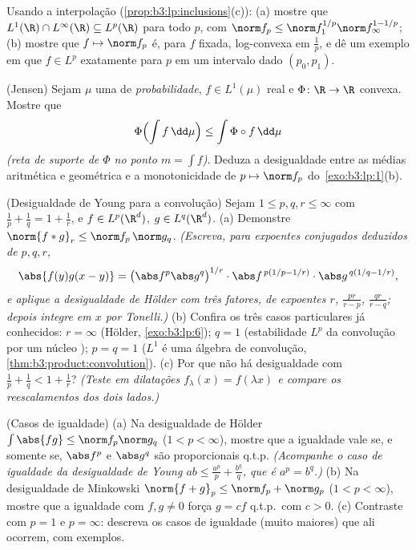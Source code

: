 \begin{exercise}[$\star\star$]\label{exo:b3:lp:9}
Usando a interpolação (\cref{prop:b3:lp:inclusions}(c)):
(a) mostre que $L^1(\R)\cap L^\infty(\R) \subseteq L^p(\R)$ para todo $p$, com $\norm f_p \leq \norm f_1^{1/p}\norm
f_\infty^{1 - 1/p}$;
(b) mostre que $f \mapsto \norm f_p$ é, para $f$ fixada, log-convexa em $\frac1p$, e dê
um exemplo em que $f \in L^p$ exatamente para $p$ em um intervalo dado
$(p_0, p_1)$.
\end{exercise}

\begin{exercise}[$\star\star$]\label{exo:b3:lp:10}
(Jensen) Sejam $\mu$ uma  de \emph{probabilidade}, $f \in
L^1(\mu)$ real
e $\Phi \colon \R \to \R$ convexa. Mostre que
\[
\Phi\Bigl(\int f\,\dd\mu\Bigr) \leq \int \Phi\circ
f\,\dd\mu
\]
\emph{(reta de suporte de $\Phi$ no ponto $m = \int f$)}. Deduza a
desigualdade entre as médias aritmética e geométrica e a monotonicidade
de $p \mapsto \norm f_p$ do~\cref{exo:b3:lp:1}(b).
\end{exercise}

\begin{exercise}[$\star\star\star$]\label{exo:b3:lp:11}
(Desigualdade de Young para a convolução) Sejam $1 \leq p, q, r \leq
\infty$ com $\frac1p + \frac1q = 1 + \frac1r$, e
$f \in
L^p(\R^d)$, $g \in L^q(\R^d)$.
(a) Demonstre $\norm{f * g}_r \leq \norm f_p\,\norm g_q$. \emph{(Escreva, para expoentes conjugados
deduzidos de $p, q,
r$,
\[
\abs{f(y)g(x-y)} = \bigl(\abs f^p\abs g^q\bigr)^{1/r}
\cdot\abs f^{\,p(1/p - 1/r)}\cdot\abs g^{\,q(1/q - 1/r)},
\]
e aplique a desigualdade de Hölder com três fatores, de expoentes
$r$, $\frac{pr}{r - p}$, $\frac{qr}{r - q}$; depois integre em $x$ por Tonelli.)}
(b) Confira os três casos particulares já conhecidos: $r =
\infty$ (Hölder,
\cref{exo:b3:lp:6}); $q = 1$ (estabilidade $L^p$ da convolução por um
núcleo ); $p = q = 1$ ($L^1$ é uma álgebra de convolução,
\cref{thm:b3:product:convolution}).
(c) Por que não há desigualdade com $\frac1p + \frac1q < 1 +
\frac1r$? \emph{(Teste em dilatações
$f_\lambda(x) =
f(\lambda x)$ e compare os reescalamentos dos dois lados.)}
\end{exercise}

\begin{exercise}[$\star\star$]\label{exo:b3:lp:12}
(Casos de igualdade) (a) Na desigualdade de Hölder $\int\abs{fg} \leq \norm f_p\norm g_q$ ($1 < p < \infty$), mostre
que a igualdade vale se, e somente se, $\abs f^p$ e $\abs g^q$ são proporcionais
q.t.p. \emph{(Acompanhe o caso de igualdade da desigualdade de Young
$ab \leq \frac{a^p}p + \frac{b^q}q$, que é $a^p
= b^q$.)}
(b) Na desigualdade de Minkowski $\norm{f + g}_p \leq \norm f_p
+ \norm g_p$ ($1 < p < \infty$), mostre que a igualdade
com $f,
g \neq 0$ força $g = cf$ q.t.p.\ com $c > 0$.
(c) Contraste com $p = 1$ e $p = \infty$: descreva os casos de igualdade
(muito maiores) que ali ocorrem, com exemplos.
\end{exercise}

